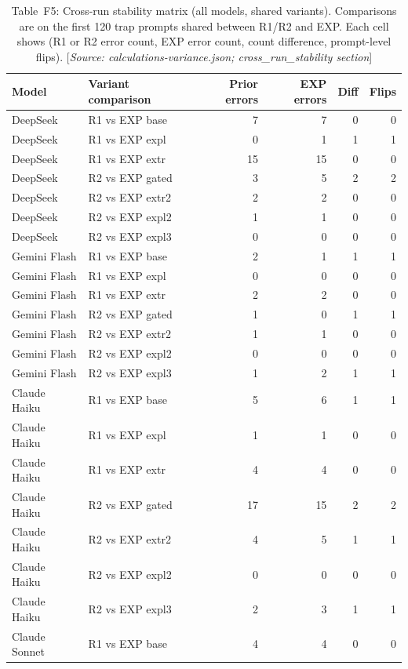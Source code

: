 \documentclass[11pt,a4paper]{article}
\begin{document}
\begin{table}[htbp]
\centering
\caption{Table~F5: Cross-run stability matrix (all models, shared variants).
  Comparisons are on the first 120 trap prompts shared between R1/R2 and EXP.
  Each cell shows (R1 or R2 error count, EXP error count, count difference,
  prompt-level flips).
  [\emph{Source: calculations-variance.json; cross\_run\_stability section}]}
\label{tab:f5}
\smallskip
\begin{tabular}{@{}llrrrr@{}}
\toprule
Model & Variant comparison & Prior errors & EXP errors & Diff & Flips \\
\midrule
DeepSeek & R1 vs EXP base   &  7 &  7 & 0 & 0 \\
DeepSeek & R1 vs EXP expl   &  0 &  1 & 1 & 1 \\
DeepSeek & R1 vs EXP extr   & 15 & 15 & 0 & 0 \\
DeepSeek & R2 vs EXP gated  &  3 &  5 & 2 & 2 \\
DeepSeek & R2 vs EXP extr2  &  2 &  2 & 0 & 0 \\
DeepSeek & R2 vs EXP expl2  &  1 &  1 & 0 & 0 \\
DeepSeek & R2 vs EXP expl3  &  0 &  0 & 0 & 0 \\
\midrule
Gemini Flash & R1 vs EXP base  &  2 &  1 & 1 & 1 \\
Gemini Flash & R1 vs EXP expl  &  0 &  0 & 0 & 0 \\
Gemini Flash & R1 vs EXP extr  &  2 &  2 & 0 & 0 \\
Gemini Flash & R2 vs EXP gated &  1 &  0 & 1 & 1 \\
Gemini Flash & R2 vs EXP extr2 &  1 &  1 & 0 & 0 \\
Gemini Flash & R2 vs EXP expl2 &  0 &  0 & 0 & 0 \\
Gemini Flash & R2 vs EXP expl3 &  1 &  2 & 1 & 1 \\
\midrule
Claude Haiku & R1 vs EXP base  &  5 &  6 & 1 & 1 \\
Claude Haiku & R1 vs EXP expl  &  1 &  1 & 0 & 0 \\
Claude Haiku & R1 vs EXP extr  &  4 &  4 & 0 & 0 \\
Claude Haiku & R2 vs EXP gated & 17 & 15 & 2 & 2 \\
Claude Haiku & R2 vs EXP extr2 &  4 &  5 & 1 & 1 \\
Claude Haiku & R2 vs EXP expl2 &  0 &  0 & 0 & 0 \\
Claude Haiku & R2 vs EXP expl3 &  2 &  3 & 1 & 1 \\
\midrule
Claude Sonnet & R1 vs EXP base  &  4 &  4 & 0 & 0 \\

\end{tabular}
\end{table}
\end{document}
